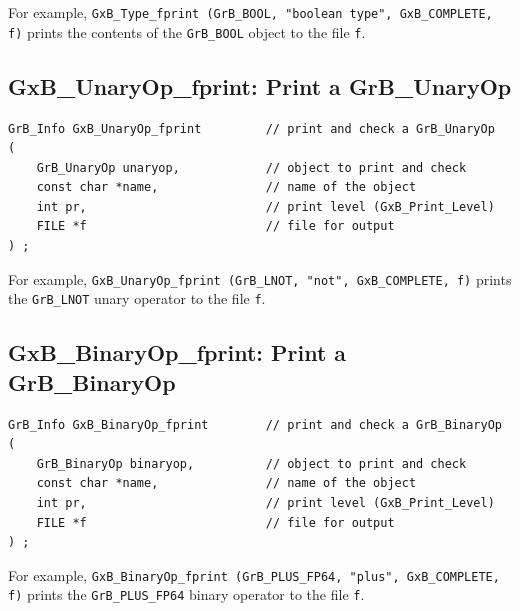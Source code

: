 For example, \verb'GxB_Type_fprint (GrB_BOOL, "boolean type", GxB_COMPLETE, f)'
prints the contents of the \verb'GrB_BOOL' object to the file \verb'f'.

\newpage
\subsection{{\sf GxB\_UnaryOp\_fprint:} Print a {\sf GrB\_UnaryOp}}

\begin{mdframed}[userdefinedwidth=6in]
{\footnotesize
\begin{verbatim}
GrB_Info GxB_UnaryOp_fprint         // print and check a GrB_UnaryOp
(
    GrB_UnaryOp unaryop,            // object to print and check
    const char *name,               // name of the object
    int pr,                         // print level (GxB_Print_Level)
    FILE *f                         // file for output
) ;
\end{verbatim} } \end{mdframed}

For example,
\verb'GxB_UnaryOp_fprint (GrB_LNOT, "not", GxB_COMPLETE, f)'
prints the \verb'GrB_LNOT' unary operator to the file \verb'f'.


\subsection{{\sf GxB\_BinaryOp\_fprint:} Print a {\sf GrB\_BinaryOp}}

\begin{mdframed}[userdefinedwidth=6in]
{\footnotesize
\begin{verbatim}
GrB_Info GxB_BinaryOp_fprint        // print and check a GrB_BinaryOp
(
    GrB_BinaryOp binaryop,          // object to print and check
    const char *name,               // name of the object
    int pr,                         // print level (GxB_Print_Level)
    FILE *f                         // file for output
) ;
\end{verbatim} } \end{mdframed}

For example,
\verb'GxB_BinaryOp_fprint (GrB_PLUS_FP64, "plus", GxB_COMPLETE, f)' prints the
\verb'GrB_PLUS_FP64' binary operator to the file \verb'f'.


